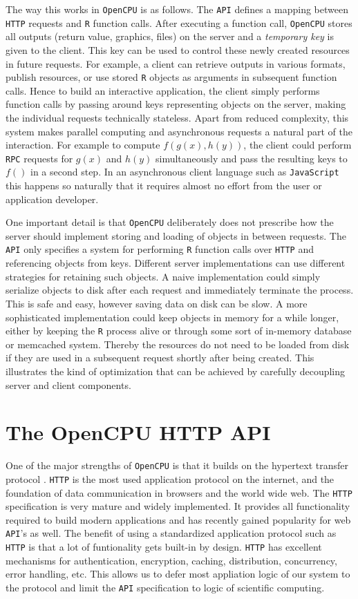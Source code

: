 \documentclass{article}
\newcommand{\R}{\texttt{R}\xspace}
\newcommand{\HTTP}{\texttt{HTTP}\xspace}
\newcommand{\API}{\texttt{API}\xspace}
\newcommand{\RPC}{\texttt{RPC}\xspace}
\newcommand{\OpenCPU}{\texttt{OpenCPU}\xspace}
\begin{document}
The way this works in \OpenCPU is as follows. The \API defines a mapping between \HTTP requests and \R function calls. After executing a function call, \OpenCPU stores all outputs (return value, graphics, files) on the server and a \emph{temporary key} is given to the client. This key can be used to control these newly created resources in future requests. For example, a client can retrieve outputs in various formats, publish resources, or use stored \R objects as arguments in subsequent function calls. Hence to build an interactive application, the client simply performs function calls by passing around keys representing objects on the server, making the individual requests technically stateless. Apart from reduced complexity, this system makes parallel computing and asynchronous requests a natural part of the interaction. For example to compute $f(g(x), h(y))$, the client could perform \RPC requests for $g(x)$ and $h(y)$ simultaneously and pass the resulting keys to $f()$ in a second step. In an asynchronous client language such as \texttt{JavaScript} this happens so naturally that it requires almost no effort from the user or application developer.

One important detail is that \OpenCPU deliberately does not prescribe how the server should implement storing and loading of objects in between requests. The \API only specifies a system for performing \R function calls over \HTTP and referencing objects from keys. Different server implementations can use different strategies for retaining such objects. A naive implementation could simply serialize objects to disk after each request and immediately terminate the process. This is safe and easy, however saving data on disk can be slow. A more sophisticated implementation could keep objects in memory for a while longer, either by keeping the \R process alive or through some sort of in-memory database or memcached system. 
Thereby the resources do not need to be loaded from disk if they are used in a subsequent request shortly after being created. This illustrates the kind of optimization that can be achieved by carefully decoupling server and client components.

 
\section{The OpenCPU HTTP API}

One of the major strengths of \OpenCPU is that it builds on the hypertext transfer protocol \citep{rfc2616}. \HTTP is the most used application protocol on the internet, and the foundation of data communication in browsers and the world wide web. The \HTTP specification is very mature and widely implemented. It provides all functionality required to build modern applications and has recently gained popularity for web \API's as well. The benefit of using a standardized application protocol such as \HTTP is that a lot of funtionality gets built-in by design. \HTTP has excellent mechanisms for authentication, encryption, caching, distribution, concurrency, error handling, etc. This allows us to defer most appliation logic of our system to the protocol and limit the \API specification to logic of scientific computing. 
\end{document}
